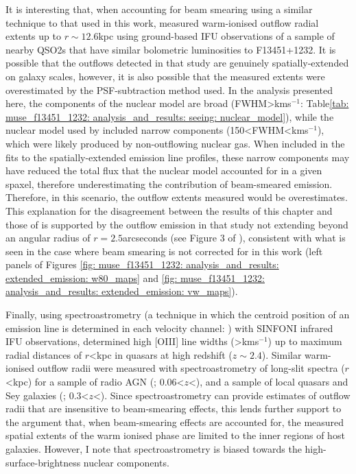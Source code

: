 It is interesting that, when accounting for beam smearing using a similar technique to that used in this work, \citet{Speranza2024} measured warm-ionised outflow radial extents up to $r\sim12.6$\;kpc using ground-based IFU observations of a sample of nearby QSO2s that have similar bolometric luminosities to F13451+1232. It is possible that the outflows detected in that study are genuinely spatially-extended on galaxy scales, however, it is also possible that the measured extents were overestimated by the PSF-subtraction method used. In the analysis presented here, the components of the nuclear model are broad (FWHM\;\textgreater{}\;km\;s$^{-1}$: Table\;\ref{tab: muse_f13451_1232: analysis_and_results: seeing: nuclear_model}), while the nuclear model used by \citet{Speranza2024} included narrow components (150\;\textless\;FWHM\;\textless{}\;km\;s$^{-1}$), which were likely produced by non-outflowing nuclear gas. When included in the fits to the spatially-extended emission line profiles, these narrow components may have reduced the total flux that the nuclear model accounted for in a given spaxel, therefore underestimating the contribution of beam-smeared emission. Therefore, in this scenario, the outflow extents measured would be overestimates. This explanation for the disagreement between the results of this chapter and those of \citet{Speranza2024} is supported by the outflow emission in that study not extending beyond an angular radius of $r=2.5$\;arcseconds (see Figure 3 of \citealt{Speranza2024}), consistent with what is seen in the case where beam smearing is not corrected for in this work (left panels of Figures \ref{fig: muse_f13451_1232: analysis_and_results: extended_emission: w80_maps} and \ref{fig: muse_f13451_1232: analysis_and_results: extended_emission: vw_maps}).

Finally, using spectroastrometry (a technique in which the centroid position of an emission line is determined in each velocity channel: \citealt{Bailey1998, Santoro2020}) with SINFONI infrared IFU observations, \citet{Carniani2015} determined high [OIII] line widths (\textgreater{}\;km\;s$^{-1}$) up to maximum radial distances of $r$\;\textless{}\;kpc in quasars at high redshift ($z\sim2.4$). Similar warm-ionised outflow radii were measured with spectroastrometry of long-slit spectra ($r$\;\textless{}\;kpc) for a sample of radio AGN (\citealt{Santoro2018, Santoro2020}; 0.06\;\textless$z$\;\textless{}), and a sample of local quasars and Sey galaxies (\citealt{VillarMartin2016}; 0.3\;\textless$z$\;\textless{}). Since spectroastrometry can provide estimates of outflow radii that are insensitive to beam-smearing effects, this lends further support to the argument that, when beam-smearing effects are accounted for, the measured spatial extents of the warm ionised phase are limited to the inner regions of host galaxies. However, I note that spectroastrometry is biased towards the high-surface-brightness nuclear components.

